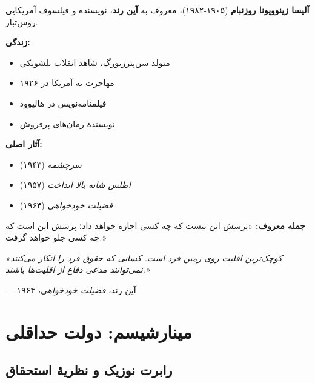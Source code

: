 \begin{tcolorbox}[
    enhanced,
    colback=gray!5,
    colframe=darkgray,
    boxrule=2pt,
    arc=10pt,
    shadow={2mm}{-2mm}{0mm}{black!30},
    fonttitle=\bfseries\large,
    title={\rl{👤 پرترهٔ متفکر: آین رند}}
]

\textbf{آلیسا زینوویونا روزنبام} (۱۹۰۵-۱۹۸۲)، معروف به \textbf{آین رند}، نویسنده و فیلسوف آمریکایی روس‌تبار.

\textbf{زندگی:}
\begin{itemize}[nosep]
    \item متولد سن‌پترزبورگ، شاهد انقلاب بلشویکی
    \item مهاجرت به آمریکا در ۱۹۲۶
    \item فیلمنامه‌نویس در هالیوود
    \item نویسندهٔ رمان‌های پرفروش
\end{itemize}

\textbf{آثار اصلی:}
\begin{itemize}[nosep]
    \item \textit{سرچشمه} (۱۹۴۳)
    \item \textit{اطلس شانه بالا انداخت} (۱۹۵۷)
    \item \textit{فضیلت خودخواهی} (۱۹۶۴)
\end{itemize}

\textbf{جمله معروف:}
«پرسش این نیست که چه کسی اجازه خواهد داد؛ پرسش این است که چه کسی جلو خواهد گرفت.»
\end{tcolorbox}

\begin{tcolorbox}[
    enhanced,
    colback=centergreen!10,
    colframe=centergreen,
    boxrule=1.5pt,
    arc=5pt,
    fonttitle=\bfseries,
    title={\rl{🟢 نقل‌قول: آین رند}}
]
\textit{«کوچک‌ترین اقلیت روی زمین فرد است. کسانی که حقوق فرد را انکار می‌کنند نمی‌توانند مدعی دفاع از اقلیت‌ها باشند.»}

\hfill --- آین رند، \textit{فضیلت خودخواهی}، ۱۹۶۴
\end{tcolorbox}


\section{مینارشیسم: دولت حداقلی}

\subsection*{رابرت نوزیک و نظریهٔ استحقاق}

